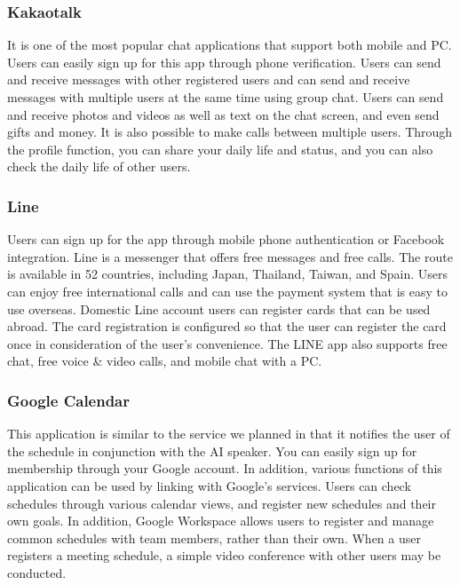 \documentclass[conference]{IEEEtran}
\begin{document}
\subsubsection{Kakaotalk}

It is one of the most popular chat applications that support both mobile and PC. Users can easily sign up for this app through phone verification. Users can send and receive messages with other registered users and can send and receive messages with multiple users at the same time using group chat. Users can send and receive photos and videos as well as text on the chat screen, and even send gifts and money. It is also possible to make calls between multiple users. Through the profile function, you can share your daily life and status, and you can also check the daily life of other users.

\subsubsection{Line}

Users can sign up for the app through mobile phone authentication or Facebook integration. Line is a messenger that offers free messages and free calls. The route is available in 52 countries, including Japan, Thailand, Taiwan, and Spain. Users can enjoy free international calls and can use the payment system that is easy to use overseas. Domestic Line account users can register cards that can be used abroad. The card registration is configured so that the user can register the card once in consideration of the user's convenience. The LINE app also supports free chat, free voice \& video calls, and mobile chat with a PC.

\subsubsection{Google Calendar}

This application is similar to the service we planned in that it notifies the user of the schedule in conjunction with the AI speaker. You can easily sign up for membership through your Google account. In addition, various functions of this application can be used by linking with Google's services. Users can check schedules through various calendar views, and register new schedules and their own goals. In addition, Google Workspace allows users to register and manage common schedules with team members, rather than their own. When a user registers a meeting schedule, a simple video conference with other users may be conducted.
\end{document}
